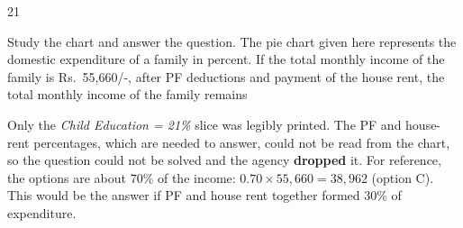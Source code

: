 \begin{question}{21}
{Study the chart and answer the question. The pie chart given here represents the domestic expenditure of a family in percent. If the total monthly income of the family is Rs.~55,660/-, after PF deductions and payment of the house rent, the total monthly income of the family remains\par}
\dropped{}
\begin{explain}
Only the \emph{Child Education = 21\%} slice was legibly printed. The PF and house-rent percentages, which are needed to answer, could not be read from the chart, so the question could not be solved and the agency \textbf{dropped} it.
For reference, the options are about 70\% of the income: $0.70\times55{,}660=38{,}962$ (option C). This would be the answer if PF and house rent together formed 30\% of expenditure.
\end{explain}
\end{question}

